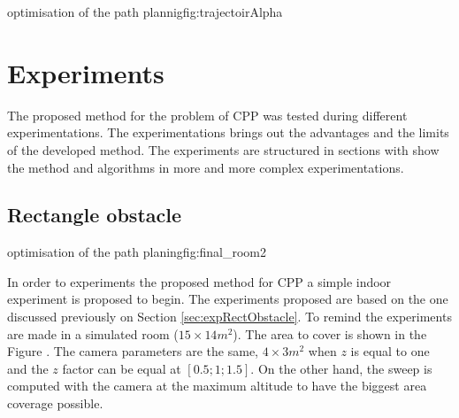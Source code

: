  \begin{mfigures}[!]{optimisation of the path plannig}{fig:trajectoirAlpha} \centering
{}
\end{mfigures} 
	
	
				



			\section{Experiments} \label{sec:experiment}
			
The proposed method for the problem of CPP was tested during different experimentations. The experimentations brings out the advantages and the limits of the developed method. The experiments are structured in sections with show the method and algorithms in more and more complex experimentations.

\subsection{Rectangle obstacle} \label{experiment}

 \begin{mfigures}[!]{optimisation of the path planing}{fig:final_room2} \centering
\hspace{1cm}

\tabsVrepPath
\end{mfigures} 

In order to experiments the proposed method for CPP a simple indoor experiment is proposed to begin.
The experiments proposed are based on the one discussed previously on Section \ref{sec:expRectObstacle}.
To remind the experiments are made in a simulated room ($15 \times 14 m^2$). The area to cover is shown in the Figure . The camera parameters are the same, $4 \times 3 m^2$ when $z$ is equal to one and the $z$ factor can be equal at $[0.5;1;1.5]$. On the other hand, the sweep is computed with the camera at the maximum altitude to have the biggest area coverage possible.

